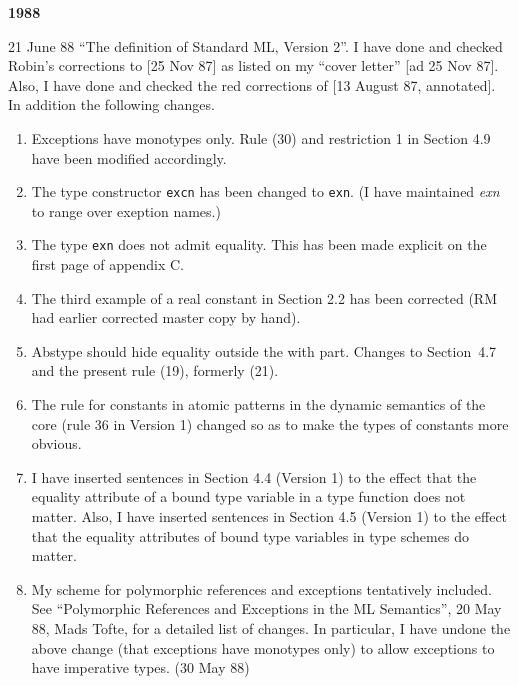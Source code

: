 \newpage
\begin{center} \bf 1988 \end{center}
\vspace{1cm}
\begin{description}
\item{21 June 88} ``The definition of Standard ML, Version 2''.
I have done and checked Robin's corrections to [25 Nov 87] 
as listed on my ``cover letter'' [ad 25 Nov 87].
Also, I have done and checked the red corrections 
of [13 August 87, annotated]. In addition the following changes.

\begin{enumerate}
\item
Exceptions have monotypes only. Rule (30) and restriction 1
in Section 4.9 have been modified accordingly. 

\item
The type constructor {\tt excn} has been changed to {\tt exn}.
(I have maintained {\it exn} to range over exeption names.)

\item
The type {\tt exn} does not admit equality. This has been
made explicit on the first page of appendix C.

\item
The third example of a real constant in Section 2.2 has been 
corrected (RM had earlier corrected master copy by hand).

\item
Abstype should hide equality outside the with part. Changes to
Section~4.7 and the present rule (19), formerly (21).

\item
The rule for constants in atomic patterns in the dynamic semantics
of the core (rule 36 in Version 1) changed so as to make the
types of constants more obvious.

\item
I have inserted sentences in Section 4.4 (Version 1) to the effect
that the equality attribute of a bound type variable in a type
function does not matter. Also, I have inserted sentences in Section 4.5
(Version 1) to the effect that the equality attributes of bound type
variables in type schemes do matter.

\item
My scheme for polymorphic references and exceptions tentatively
included. See ``Polymorphic References and Exceptions in the
ML Semantics'', 20 May 88, Mads Tofte, for a detailed list of
changes. In particular, I have undone the above change (that
exceptions have monotypes only) to allow exceptions
to have imperative types. (30 May 88)


\end{enumerate}
\end{description}
